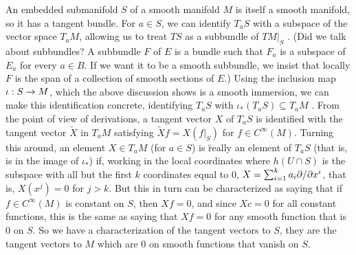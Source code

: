\msk

An embedded submanifold $S$ of a smooth manifold $M$ is itself a smooth manifold, so it has a
tangent bundle. For $a\in S$, we can identify $T_aS$ with a subspace of the vector space $T_aM$,
allowing us to treat $TS$ as a subbundle of $TM|_S$ . (Did we talk about subbundles?
A subbundle $F$ of $E$ is a bundle such that $F_a$ is a subspace of $E_a$ for 
every $a\in B$. If we want it to be a smooth subbundle, we insist that locally $F$ is the
span of a collection of smooth sections of $E$.) Using the inclusion map $\iota:S\rightarrow M$,
which the above discussion shows is a smooth immersion, we can make this identification
concrete, identifying $T_aS$ with $\iota_*(T_aS)\subseteq T_aM$ . From the point of 
view of derivations, a tangent vector $X$ of $T_aS$ is identified with the
tangent vector $\widetilde{X}$ in $T_aM$ satisfying $\widetilde{X}f=X(f|_S)$
for $f\in C^\infty(M)$. Turning this around, an element $X\in T_aM$ (for $a\in S$) is
\u{really} an element of $T_aS$ (that is, is in the image of $\iota_*$) if, working 
in the local coordinates where $h(U\cap S)$ is the subspace with all but the first
$k$ coordinates equal to $0$, $X=\sum_{i=1}^k a_i\partial/\partial x^i$, that is, 
$X(x^j)=0$ for $j>k$. But this in turn can be characterized as saying that if $f\in C^\infty(M)$
is constant on $S$, then $Xf=0$, and since $Xc=0$ for all constant functions, 
this is the same as saying that $Xf=0$ for any smooth function that is $0$ on $S$.
So we have a characterization of the tangent vectors to $S$, they are the tangent
vectors to $M$ which are $0$ on smooth functions that vanish on $S$.

\msk


